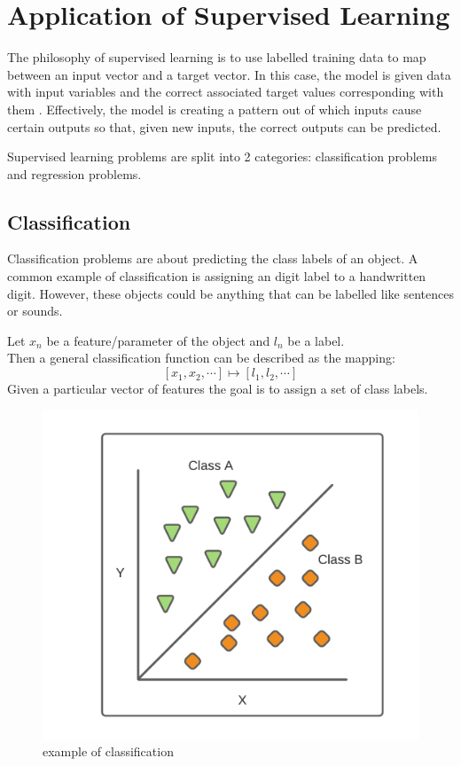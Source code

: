 \documentclass[10pt,a4paper]{report}
\begin{document}
		\section{Application of Supervised Learning}
			The philosophy of supervised learning is to use labelled training data to map between
			an input vector and a target vector. In this case, the model is given
			data with input variables and the correct associated target values corresponding with them \autocite[p. 105]{DeepLearning}.
			Effectively, the model is creating a pattern out of which inputs cause certain outputs so that,
			given new inputs, the correct outputs can be predicted. \par
			Supervised learning problems are split into 2 categories: classification problems and regression problems.

			\subsection{Classification}
				Classification problems are about predicting the class labels of an object. A common example
				of classification is assigning an digit label to a handwritten digit. However, these objects
				could be anything that can be labelled like sentences or sounds. \par
				Let $x_n$ be a feature/parameter of the object and $l_n$ be a label.\\
				Then a general classification function can be described as the mapping: \[[x_1,x_2,\cdots] \mapsto [l_1,l_2,\cdots]\]
				Given a particular vector of features the goal is to assign a set of class labels.
				\begin{figure}[h]
					\centering
					\includegraphics[scale=0.7]{classification-diagram.png}
					\caption{example of classification}
					\label{fig:classifcation}
				\end{figure}
\end{document}

